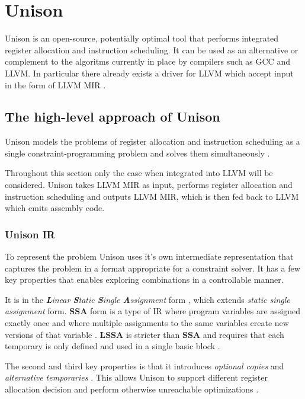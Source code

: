 \section{Unison}
\label{sec:unison}

Unison is an open-source, potentially optimal tool that performs integrated register
allocation and instruction scheduling. It can be used as an alternative or complement to
the algoritms currently in place by compilers such as GCC and LLVM. In particular there
already exists a driver for LLVM which accept input in the form of LLVM MIR \cite{unison-docs}.

\subsection{The high-level approach of Unison}

Unison models the problems of register allocation and instruction scheduling as a single
constraint-programming problem and solves them simultaneously \cite{unison-docs,reg-alloc-inst-sched-uni}.

Throughout this section only the case when integrated into LLVM will be considered. Unison
takes LLVM MIR as input, performs register allocation and instruction scheduling and outputs
LLVM MIR, which is then fed back to LLVM which emits assembly code.

\subsubsection{Unison IR}

To represent the problem Unison uses it's own intermediate representation that captures
the problem in a format appropriate for a constraint solver. It has a few key properties
that enables exploring combinations in a controllable manner.

It is in the \textit{\textbf{L}inear \textbf{S}tatic \textbf{S}ingle \textbf{A}ssignment}
form \cite{reg-alloc-inst-sched-uni}, which extends \textit{static single assignment} form.
\textbf{SSA} form is a type of IR where program variables are assigned exactly once and
where multiple assignments to the same variables create new versions of that variable
\cite{gcc-ssa}. \textbf{LSSA} is stricter than \textbf{SSA} and requires that each temporary
is only defined and used in a single basic block \cite[Section~3.2]{constraint-based}.

The second and third key properties is that it introduces \textit{optional copies} and
\textit{alternative temporaries} \cite{reg-alloc-inst-sched-uni}. This allows Unison to
support different register allocation decision and perform otherwise unreachable optimizations
\cite{reg-alloc-inst-sched-uni, comb-spill}.

